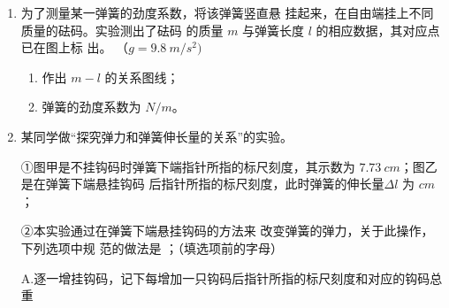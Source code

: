 \begin{enumerate}
\renewcommand{\labelenumi}{\arabic{enumi}.}
\item
{}
为了测量某一弹簧的劲度系数，将该弹簧竖直悬
挂起来，在自由端挂上不同质量的砝码。实验测出了砝码
的质量 $ m $ 与弹簧长度 $ l $ 的相应数据，其对应点已在图上标
出。
（$ g=9.8 \ m/s^{2}) $
\begin{figure}[h!]
\centering

\end{figure}

\begin{enumerate}
\renewcommand{\labelenumi}{\arabic{enumi}.}
\item
作出 $ m-l $ 的关系图线；
\banswer{
  
}

\item 
弹簧的劲度系数为  $ N/m $。



\end{enumerate}



\banswer{

}


\newpage
\item
{}
某同学做“探究弹力和弹簧伸长量的关系”的实验。

①图甲是不挂钩码时弹簧下端指针所指的标尺刻度，其示数为 $ 7.73 \ cm $；图乙是在弹簧下端悬挂钩码
后指针所指的标尺刻度，此时弹簧的伸长量$ \Delta l $
为  $ cm $；
\begin{figure}[h!]
\centering

\end{figure}


②本实验通过在弹簧下端悬挂钩码的方法来
改变弹簧的弹力，关于此操作，下列选项中规
范的做法是  ；（填选项前的字母）


A.逐一增挂钩码，记下每增加一只钩码后指针所指的标尺刻度和对应的钩码总重


\end{enumerate}
